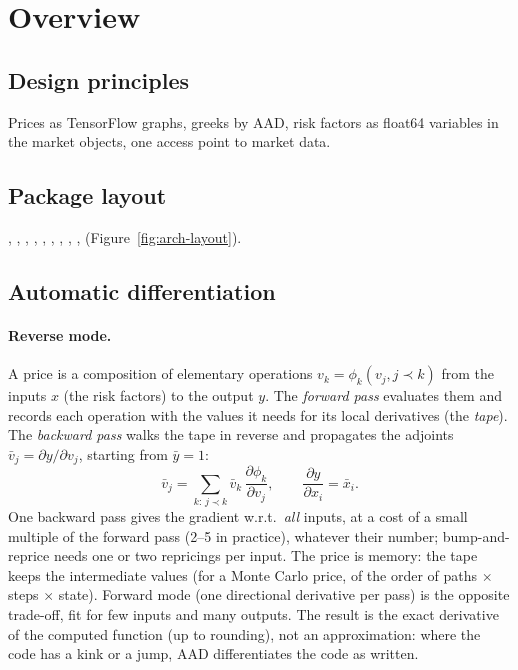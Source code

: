 \section{Overview}\label{sec:arch-overview}

\subsection{Design principles}\label{sec:arch-principles}
Prices as TensorFlow graphs, greeks by AAD, risk factors as float64 variables in the market objects,
one access point to market data.

\pending

\subsection{Package layout}\label{sec:arch-layout}
, , , , ,
, , , , 
(Figure~\ref{fig:arch-layout}).



\subsection{Automatic differentiation}\label{sec:arch-aad-principle}
\paragraph{Reverse mode.} A price is a composition of elementary operations $v_k = \phi_k(v_{j}, j \prec k)$ from the
inputs $x$ (the risk factors) to the output $y$. The \emph{forward pass} evaluates them and records each operation with
the values it needs for its local derivatives (the \emph{tape}). The \emph{backward pass} walks the tape in reverse and
propagates the adjoints $\bar v_j = \partial y/\partial v_j$, starting from $\bar y = 1$:
\[
  \bar v_j = \sum_{k:\, j \prec k} \bar v_k\,\frac{\partial \phi_k}{\partial v_j},
  \qquad \frac{\partial y}{\partial x_i} = \bar x_i .
\]
One backward pass gives the gradient w.r.t.\ \emph{all} inputs, at a cost of a small multiple of the forward pass (2--5
in practice), whatever their number; bump-and-reprice needs one or two repricings per input. The price is memory: the
tape keeps the intermediate values (for a Monte Carlo price, of the order of paths $\times$ steps $\times$ state). Forward
mode (one directional derivative per pass) is the opposite trade-off, fit for few inputs and many outputs. The result is
the exact derivative of the computed function (up to rounding), not an approximation: where the code has a kink or a
jump, AAD differentiates the code as written.

